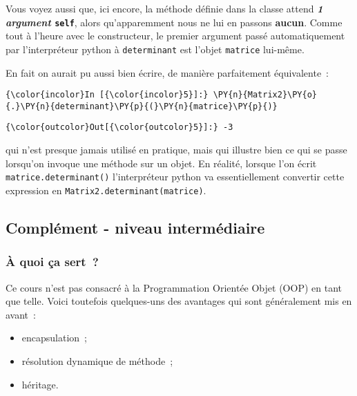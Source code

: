     Vous voyez aussi que, ici encore, la méthode définie dans la classe
attend \textbf{\emph{1 argument} \texttt{self}}, alors qu'apparemment
nous ne lui en passons \textbf{aucun}. Comme tout à l'heure avec le
constructeur, le premier argument passé automatiquement par
l'interpréteur python à \texttt{determinant} est l'objet
\texttt{matrice} lui-même.

En fait on aurait pu aussi bien écrire, de manière parfaitement
équivalente~:

    \begin{Verbatim}[commandchars=\\\{\}]
{\color{incolor}In [{\color{incolor}5}]:} \PY{n}{Matrix2}\PY{o}{.}\PY{n}{determinant}\PY{p}{(}\PY{n}{matrice}\PY{p}{)}
\end{Verbatim}


\begin{Verbatim}[commandchars=\\\{\}]
{\color{outcolor}Out[{\color{outcolor}5}]:} -3
\end{Verbatim}
            
    qui n'est presque jamais utilisé en pratique, mais qui illustre bien ce
qui se passe lorsqu'on invoque une méthode sur un objet. En réalité,
lorsque l'on écrit \texttt{matrice.determinant()} l'interpréteur python
va essentiellement convertir cette expression en
\texttt{Matrix2.determinant(matrice)}.

    \hypertarget{compluxe9ment---niveau-intermuxe9diaire}{%
\subsection{Complément - niveau
intermédiaire}\label{compluxe9ment---niveau-intermuxe9diaire}}

    \hypertarget{uxe0-quoi-uxe7a-sert}{%
\subsubsection{À quoi ça sert~?}\label{uxe0-quoi-uxe7a-sert}}

    Ce cours n'est pas consacré à la Programmation Orientée Objet (OOP) en
tant que telle. Voici toutefois quelques-uns des avantages qui sont
généralement mis en avant~:

\begin{itemize}
\tightlist
\item
  encapsulation~;
\item
  résolution dynamique de méthode~;
\item
  héritage.
\end{itemize}

